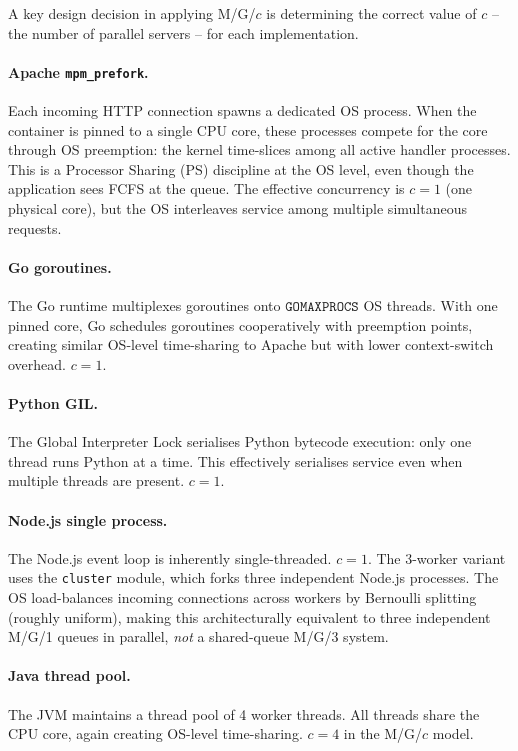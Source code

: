 A key design decision in applying M/G/$c$ is determining the correct value of $c$ -- the number of parallel servers -- for each implementation.

\paragraph{Apache \texttt{mpm\_prefork}.}
Each incoming HTTP connection spawns a dedicated OS process. When the container is pinned to a single CPU core, these processes compete for the core through OS preemption: the kernel time-slices among all active handler processes. This is a Processor Sharing (PS) discipline at the OS level, even though the application sees FCFS at the queue. The effective concurrency is $c = 1$ (one physical core), but the OS interleaves service among multiple simultaneous requests.

\paragraph{Go goroutines.}
The Go runtime multiplexes goroutines onto $\texttt{GOMAXPROCS}$ OS threads. With one pinned core, Go schedules goroutines cooperatively with preemption points, creating similar OS-level time-sharing to Apache but with lower context-switch overhead. $c = 1$.

\paragraph{Python GIL.}
The Global Interpreter Lock serialises Python bytecode execution: only one thread runs Python at a time. This effectively serialises service even when multiple threads are present. $c = 1$.

\paragraph{Node.js single process.}
The Node.js event loop is inherently single-threaded. $c = 1$. The 3-worker variant uses the \texttt{cluster} module, which forks three independent Node.js processes. The OS load-balances incoming connections across workers by Bernoulli splitting (roughly uniform), making this architecturally equivalent to three independent M/G/1 queues in parallel, \emph{not} a shared-queue M/G/3 system.

\paragraph{Java thread pool.}
The JVM maintains a thread pool of 4 worker threads. All threads share the CPU core, again creating OS-level time-sharing. $c = 4$ in the M/G/$c$ model.

